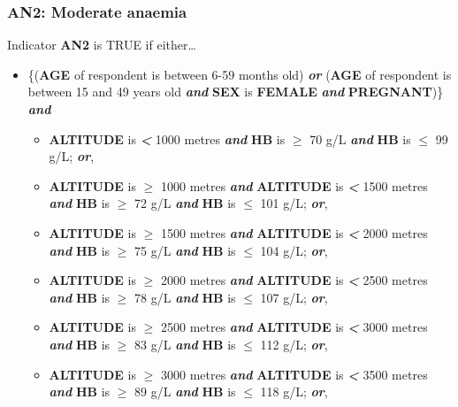 \documentclass[12pt,a4paper]{article}
\begin{document}
\hypertarget{an2-moderate-anaemia}{%
\subsubsection{AN2: Moderate anaemia}\label{an2-moderate-anaemia}}

Indicator \textbf{AN2} is TRUE if either\ldots{}

\begin{itemize}
\item
  \{(\textbf{AGE} of respondent is between 6-59 months old) \textbf{\emph{or}} (\textbf{AGE} of respondent is between 15 and 49 years old \textbf{\emph{and}} \textbf{SEX} is \textbf{FEMALE} \textbf{\emph{and}} \textbf{PREGNANT})\} \textbf{\emph{and}}

  \begin{itemize}
  \item
    \textbf{ALTITUDE} is \textbf{\emph{\textless{}}} 1000 metres \textbf{\emph{and}} \textbf{HB} is \textbf{\emph{\(\geq\)}} 70 g/L \textbf{\emph{and}} \textbf{HB}
    is \textbf{\emph{\(\leq\)}} 99 g/L; \textbf{\emph{or}},
  \item
    \textbf{ALTITUDE} is \textbf{\emph{\(\geq\)}} 1000 metres \textbf{\emph{and}} \textbf{ALTITUDE} is \textbf{\emph{\textless{}}} 1500 metres \textbf{\emph{and}} \textbf{HB} is \textbf{\emph{\(\geq\)}} 72 g/L \textbf{\emph{and}} \textbf{HB} is \textbf{\emph{\(\leq\)}} 101 g/L; \textbf{\emph{or}},
  \item
    \textbf{ALTITUDE} is \textbf{\emph{\(\geq\)}} 1500 metres \textbf{\emph{and}} \textbf{ALTITUDE} is \textbf{\emph{\textless{}}} 2000 metres \textbf{\emph{and}} \textbf{HB} is \textbf{\emph{\(\geq\)}} 75 g/L \textbf{\emph{and}} \textbf{HB} is \textbf{\emph{\(\leq\)}} 104 g/L; \textbf{\emph{or}},
  \item
    \textbf{ALTITUDE} is \textbf{\emph{\(\geq\)}} 2000 metres \textbf{\emph{and}} \textbf{ALTITUDE} is \textbf{\emph{\textless{}}} 2500 metres \textbf{\emph{and}} \textbf{HB} is \textbf{\emph{\(\geq\)}} 78 g/L \textbf{\emph{and}} \textbf{HB} is \textbf{\emph{\(\leq\)}} 107 g/L; \textbf{\emph{or}},
  \item
    \textbf{ALTITUDE} is \textbf{\emph{\(\geq\)}} 2500 metres \textbf{\emph{and}} \textbf{ALTITUDE} is \textbf{\emph{\textless{}}} 3000 metres \textbf{\emph{and}} \textbf{HB} is \textbf{\emph{\(\geq\)}} 83 g/L \textbf{\emph{and}} \textbf{HB} is \textbf{\emph{\(\leq\)}} 112 g/L; \textbf{\emph{or}},
  \item
    \textbf{ALTITUDE} is \textbf{\emph{\(\geq\)}} 3000 metres \textbf{\emph{and}} \textbf{ALTITUDE} is \textbf{\emph{\textless{}}} 3500 metres \textbf{\emph{and}} \textbf{HB} is \textbf{\emph{\(\geq\)}} 89 g/L \textbf{\emph{and}} \textbf{HB} is \textbf{\emph{\(\leq\)}} 118 g/L; \textbf{\emph{or}},

\end{itemize}
\end{itemize}
\end{document}
